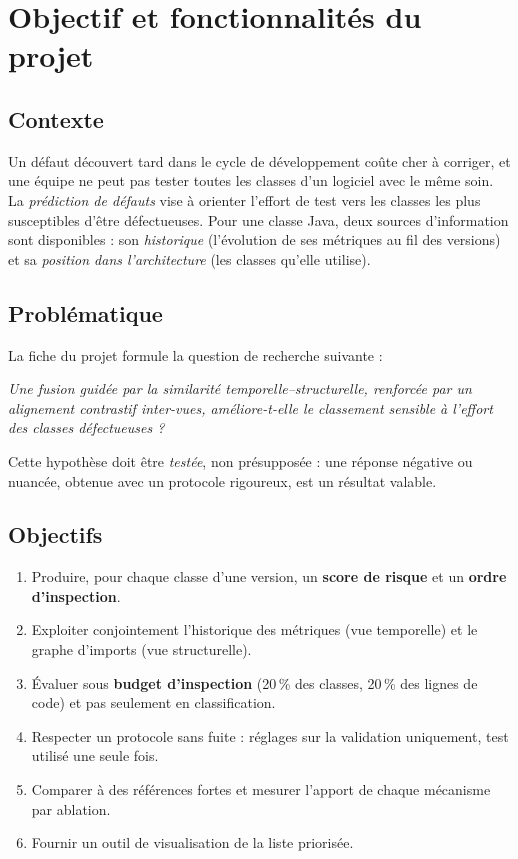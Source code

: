\documentclass[11pt,a4paper,openany]{report}
\begin{document}
{\hypersetup{linkcolor=black}\tableofcontents}
\listoffigures
{\let\clearpage\relax\let\cleardoublepage\relax\vspace{1cm}\listoftables}

\cleardoublepage
{}

\chapter{Objectif et fonctionnalités du projet}

\section{Contexte}
Un défaut découvert tard dans le cycle de développement coûte cher à corriger, et une équipe ne peut pas tester
toutes les classes d'un logiciel avec le même soin. La \emph{prédiction de défauts} vise à orienter l'effort de test
vers les classes les plus susceptibles d'être défectueuses. Pour une classe Java, deux sources d'information sont
disponibles : son \emph{historique} (l'évolution de ses métriques au fil des versions) et sa \emph{position dans
l'architecture} (les classes qu'elle utilise).

\section{Problématique}
La fiche du projet formule la question de recherche suivante :
\begin{keybox}
\itshape Une fusion guidée par la similarité temporelle--structurelle, renforcée par un alignement contrastif
inter-vues, améliore-t-elle le classement sensible à l'effort des classes défectueuses ?
\end{keybox}
Cette hypothèse doit être \emph{testée}, non présupposée : une réponse négative ou nuancée, obtenue avec un protocole
rigoureux, est un résultat valable.

\section{Objectifs}
\begin{enumerate}
  \item Produire, pour chaque classe d'une version, un \textbf{score de risque} et un \textbf{ordre d'inspection}.
  \item Exploiter conjointement l'historique des métriques (vue temporelle) et le graphe d'imports (vue structurelle).
  \item Évaluer sous \textbf{budget d'inspection} (20\,\% des classes, 20\,\% des lignes de code) et pas seulement
        en classification.
  \item Respecter un protocole sans fuite : réglages sur la validation uniquement, test utilisé une seule fois.
  \item Comparer à des références fortes et mesurer l'apport de chaque mécanisme par ablation.
  \item Fournir un outil de visualisation de la liste priorisée.
\end{enumerate}
\end{document}
